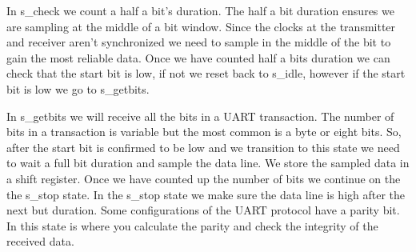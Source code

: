 In s\_check we count a half a bit's duration. The half a bit duration ensures we are sampling at the middle of a bit window. Since the clocks at the transmitter and receiver aren't synchronized we need to sample in the middle of the bit to gain the most reliable data. Once we have counted half a bits duration we can check that the start bit is low, if not we reset back to s\_idle, however if the start bit is low we go to s\_getbits.

In s\_getbits we will receive all the bits in a UART transaction. The number of bits in a transaction is variable but the most common is a byte or eight bits. So, after the start bit is confirmed to be low and we transition to this state we need to wait a full bit duration and sample the data line. We store the sampled data in a shift register. Once we have counted up the number of bits we continue on the the s\_stop state. In the s\_stop state we make sure the data line is high after the next but duration. Some configurations of the UART protocol have a parity bit. In this state is where you calculate the parity and check the integrity of the received data. 

